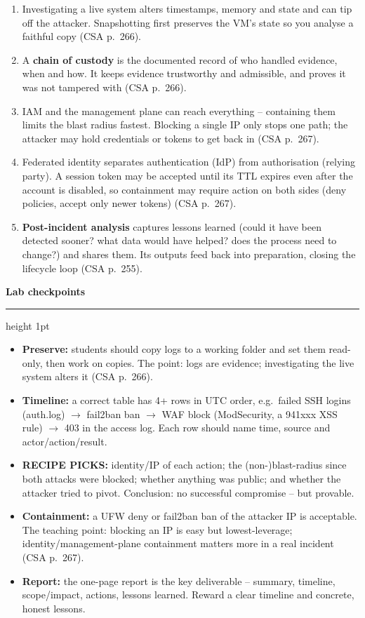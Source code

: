 \documentclass[11pt]{article}
\newcommand{\wbsection}[1]{\par\vspace{11pt}\noindent
  {\large\bfseries\color{kred}#1}\par\vspace{2pt}
  {\color{kred!35}\hrule height 1pt}\par\vspace{6pt}}
\renewcommand{\emph}[1]{\textup{#1}}
\begin{document}
\begin{enumerate}
      p.~265).
\item Investigating a live system alters timestamps, memory and state and can tip off the attacker.
      Snapshotting first preserves the VM's state so you analyse a faithful copy (CSA p.~266).
\item A \textbf{chain of custody} is the documented record of who handled evidence, when and how. It keeps
      evidence trustworthy and admissible, and proves it was not tampered with (CSA p.~266).
\item IAM and the management plane can reach \emph{everything} -- containing them limits the blast radius
      fastest. Blocking a single IP only stops one path; the attacker may hold credentials or tokens to
      get back in (CSA p.~267).
\item Federated identity separates authentication (IdP) from authorisation (relying party). A session
      token may be accepted until its TTL expires even after the account is disabled, so containment may
      require action on \emph{both} sides (deny policies, accept only newer tokens) (CSA p.~267).
\item \textbf{Post-incident analysis} captures lessons learned (could it have been detected sooner? what
      data would have helped? does the process need to change?) and shares them. Its outputs feed back
      into \emph{preparation}, closing the lifecycle loop (CSA p.~255).
\end{enumerate}

\wbsection{Lab checkpoints}
\begin{itemize}
\item \textbf{Preserve:} students should copy logs to a working folder and set them read-only, then work
      on copies. The point: logs are evidence; investigating the live system alters it (CSA p.~266).
\item \textbf{Timeline:} a correct table has 4+ rows in UTC order, e.g.\ failed SSH logins (auth.log)
      $\rightarrow$ fail2ban ban $\rightarrow$ WAF block (ModSecurity, a 941xxx XSS rule) $\rightarrow$
      403 in the access log. Each row should name time, source and actor/action/result.
\item \textbf{RECIPE PICKS:} identity/IP of each action; the (non-)blast-radius since both attacks were
      blocked; whether anything was public; and whether the attacker tried to pivot. Conclusion: no
      successful compromise -- but provable.
\item \textbf{Containment:} a UFW deny or fail2ban ban of the attacker IP is acceptable. The teaching
      point: blocking an IP is easy but lowest-leverage; identity/management-plane containment matters
      more in a real incident (CSA p.~267).
\item \textbf{Report:} the one-page report is the key deliverable -- summary, timeline, scope/impact,
      actions, lessons learned. Reward a clear timeline and concrete, honest lessons.
\end{itemize}
\end{document}
